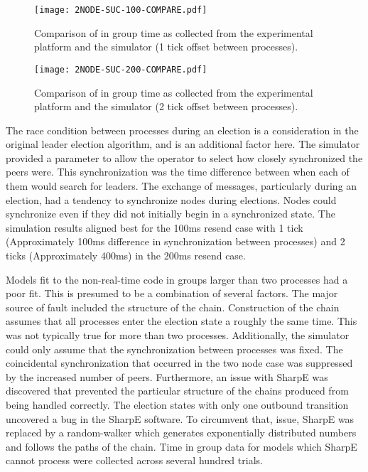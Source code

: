 \begin{figure}[!h]
\centering
\texttt{[image: 2NODE-SUC-100-COMPARE.pdf]}
\caption{Comparison of in group time as collected from the experimental platform and the simulator (1 tick offset between processes).}
\label{fig:COMPARE-SUC-2NODE-100}
\end{figure}

\begin{figure}[!h]
\centering
\texttt{[image: 2NODE-SUC-200-COMPARE.pdf]}

\caption{Comparison of in group time as collected from the experimental platform and the simulator (2 tick offset between processes).}
\label{fig:COMPARE-SUC-2NODE-200}
\end{figure}

The race condition between processes during an election is a consideration in the original leader election algorithm, and is an additional factor here.
The simulator provided a parameter to allow the operator to select how closely synchronized the peers were.
This synchronization was the time difference between when each of them would search for leaders.
The exchange of messages, particularly during an election, had a tendency to synchronize nodes during elections.
Nodes could synchronize even if they did not initially begin in a synchronized state. 
The simulation results aligned best for the 100ms resend case with 1 tick (Approximately 100ms difference in synchronization between processes) and 2 ticks (Approximately 400ms) in the 200ms resend case.

Models fit to the non-real-time code in groups larger than two processes had a poor fit.
This is presumed to be a combination of several factors.
The major source of fault included the structure of the chain. 
Construction of the chain assumes that all processes enter the election state a roughly the same time. 
This was not typically true for more than two processes.
Additionally, the simulator could only assume that the synchronization between processes was fixed.
The coincidental synchronization that occurred in the two node case was suppressed by the increased number of peers.
Furthermore, an issue with SharpE was discovered that prevented the particular structure of the chains produced from being handled correctly.
The election states with only one outbound transition uncovered a bug in the SharpE software.
To circumvent that, issue, SharpE was replaced by a random-walker which generates exponentially distributed numbers and follows the paths of the chain.
Time in group data for models which SharpE cannot process were collected across several hundred trials.

